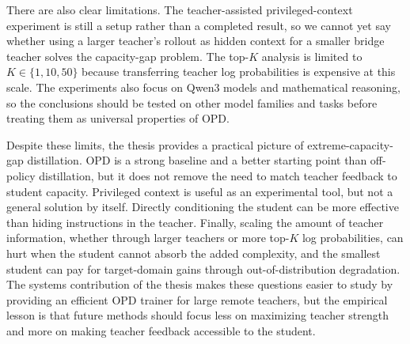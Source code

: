 There are also clear limitations. The teacher-assisted privileged-context experiment is still a setup rather than a completed result, so we cannot yet say whether using a larger teacher's rollout as hidden context for a smaller bridge teacher solves the capacity-gap problem. The top-$K$ analysis is limited to $K \in \{1, 10, 50\}$ because transferring teacher log probabilities is expensive at this scale. The experiments also focus on Qwen3 models and mathematical reasoning, so the conclusions should be tested on other model families and tasks before treating them as universal properties of OPD.

Despite these limits, the thesis provides a practical picture of extreme-capacity-gap distillation. OPD is a strong baseline and a better starting point than off-policy distillation, but it does not remove the need to match teacher feedback to student capacity. Privileged context is useful as an experimental tool, but not a general solution by itself. Directly conditioning the student can be more effective than hiding instructions in the teacher. Finally, scaling the amount of teacher information, whether through larger teachers or more top-$K$ log probabilities, can hurt when the student cannot absorb the added complexity, and the smallest student can pay for target-domain gains through out-of-distribution degradation. The systems contribution of the thesis makes these questions easier to study by providing an efficient OPD trainer for large remote teachers, but the empirical lesson is that future methods should focus less on maximizing teacher strength and more on making teacher feedback accessible to the student.
